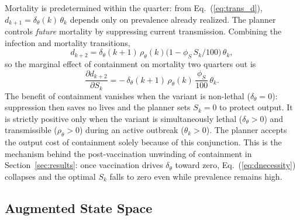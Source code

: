 \documentclass[12pt, a4paper]{article}
\begin{document}
Mortality is predetermined within the quarter: from Eq.~(\ref{eq:trans_d}),
$d_{k+1} = \delta_\theta(k)\,\theta_k$ depends only on prevalence already
realized. The planner controls \emph{future} mortality by suppressing current
transmission. Combining the infection and mortality transitions,
%
\begin{equation}
    d_{k+2} = \delta_\theta(k+1)\,\rho_\theta(k)\bigl(1 - \phi_S\, S_k/100\bigr)\,\theta_k,
    \label{eq:excess_dynamics}
\end{equation}
%
so the marginal effect of containment on mortality two quarters out is
%
\begin{equation}
    \frac{\partial d_{k+2}}{\partial S_k}
    = -\,\delta_\theta(k+1)\,\rho_\theta(k)\,\frac{\phi_S}{100}\,\theta_k .
    \label{eq:dnecessity}
\end{equation}
%
The benefit of containment vanishes when the variant is non-lethal
($\delta_\theta = 0$): suppression then saves no lives and the planner sets
$S_k = 0$ to protect output. It is strictly positive only when the variant is
simultaneously lethal ($\delta_\theta > 0$) and transmissible
($\rho_\theta > 0$) during an active outbreak ($\theta_k > 0$). The planner
accepts the output cost of containment solely because of this conjunction. This
is the mechanism behind the post-vaccination unwinding of containment in
Section~\ref{sec:results}: once vaccination drives $\delta_\theta$ toward zero,
Eq.~(\ref{eq:dnecessity}) collapses and the optimal $S_k$ falls to zero even
while prevalence remains high.

\subsection{Augmented State Space}
\label{app:augmented}
\end{document}
